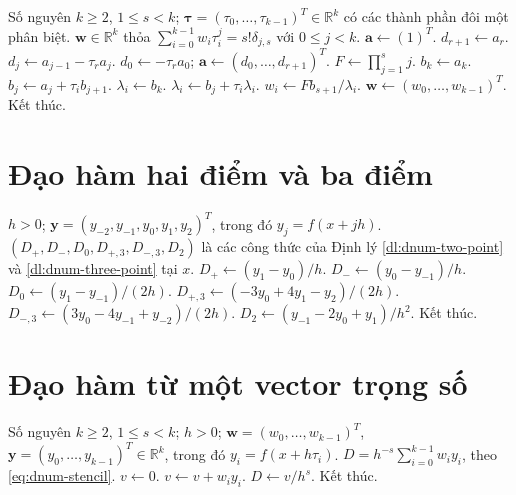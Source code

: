 \documentclass[12pt,a4paper,oneside]{book}
\numberwithin{algorithm}{chapter}
\theoremstyle{definition}
\newcommand{\R}{\mathbb{R}}
\begin{document}
\begin{algorithm}[H]
\caption{Dựng trọng số đạo hàm bằng Horner -- chi tiết}
\label{alg:dnum-weights-detailed}
\small
\begin{algorithmic}[1]
\Require Số nguyên $k\geq2$, $1\leq s<k$; $\boldsymbol\tau=(\tau_0,\ldots,\tau_{k-1})^T\in\R^k$ có các thành phần đôi một phân biệt.
\Ensure $\boldsymbol w\in\R^k$ thỏa $\sum_{i=0}^{k-1}w_i\tau_i^j=s!\delta_{j,s}$ với $0\leq j<k$.
\State $\boldsymbol a\gets(1)^T$.
  \State $d_{r+1}\gets a_r$.
    \State $d_j\gets a_{j-1}-\tau_ra_j$.
  \EndFor
  \Statex
  \State $d_0\gets-\tau_ra_0$; $\boldsymbol a\gets(d_0,\ldots,d_{r+1})^T$.
\EndFor
\Statex
\State $F\gets\prod_{j=1}^{s}j$.
  \State $b_k\gets a_k$.
    \State $b_j\gets a_j+\tau_ib_{j+1}$.
  \EndFor
  \Statex
  \State $\lambda_i\gets b_k$.
    \State $\lambda_i\gets b_j+\tau_i\lambda_i$.
  \EndFor
  \Statex
  \State $w_i\gets F b_{s+1}/\lambda_i$.
\EndFor
\Statex
\State $\boldsymbol w\gets(w_0,\ldots,w_{k-1})^T$.
\State Kết thúc.
\end{algorithmic}
\end{algorithm}

\section{Đạo hàm hai điểm và ba điểm}
\begin{algorithm}[H]
\caption{Tính các công thức đạo hàm hai điểm và ba điểm}
\label{alg:dnum-small-stencils}
\begin{algorithmic}[1]
\Require $h>0$; $\boldsymbol y=(y_{-2},y_{-1},y_0,y_1,y_2)^T$, trong đó $y_j=f(x+jh)$.
\Ensure $(D_+,D_-,D_0,D_{+,3},D_{-,3},D_2)$ là các công thức của Định lý \ref{dl:dnum-two-point} và \ref{dl:dnum-three-point} tại $x$.
\State $D_+\gets(y_1-y_0)/h$.
\State $D_-\gets(y_0-y_{-1})/h$.
\State $D_0\gets(y_1-y_{-1})/(2h)$.
\State $D_{+,3}\gets(-3y_0+4y_1-y_2)/(2h)$.
\State $D_{-,3}\gets(3y_0-4y_{-1}+y_{-2})/(2h)$.
\State $D_2\gets(y_{-1}-2y_0+y_1)/h^2$.
\State Kết thúc.
\end{algorithmic}
\end{algorithm}

\section{Đạo hàm từ một vector trọng số}
\begin{algorithm}[H]
\caption{Tính công thức đạo hàm $k$ điểm}
\label{alg:dnum-apply}
\begin{algorithmic}[1]
\Require Số nguyên $k\geq2$, $1\leq s<k$; $h>0$; $\boldsymbol w=(w_0,\ldots,w_{k-1})^T$, $\boldsymbol y=(y_0,\ldots,y_{k-1})^T\in\R^k$, trong đó $y_i=f(x+h\tau_i)$.
\Ensure $D=h^{-s}\sum_{i=0}^{k-1}w_i y_i$, theo \eqref{eq:dnum-stencil}.
\State $v\gets0$.
  \State $v\gets v+w_i y_i$.
\EndFor
\Statex
\State $D\gets v/h^s$.
\State Kết thúc.
\end{algorithmic}
\end{algorithm}
\end{document}
